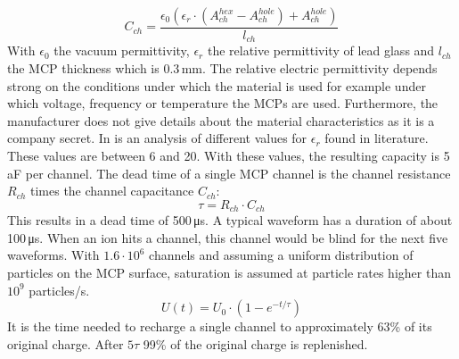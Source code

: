 	\begin{equation}
		C_{ch} = \frac{\epsilon_0  (\epsilon_r \cdot (A^{hex}_{ch} - A^{hole}_{ch})+ A^{hole}_{ch})}{l_{ch}}
	\end{equation}
	With $\epsilon_0$ the vacuum permittivity, $\epsilon_r$ the relative permittivity of lead glass and $l_{ch}$ the MCP thickness which is 0.3\,\si{\milli\meter}. The relative electric permittivity depends strong on the conditions under which the material is used for example under which voltage, frequency or temperature the MCPs are used. Furthermore, the manufacturer does not give details about the material characteristics as it is a company secret. In \cite{Diss_Neuland} is an analysis of different values for $\epsilon_r$ found in literature. These values are between 6 and 20. With these values, the resulting capacity is 5\,\si{\atto\farad} per channel. The dead time of a single MCP channel is the channel resistance $R_{ch}$ times the channel capacitance $C_{ch}$:
	\begin{equation}
		\tau = R_{ch}\cdot C_{ch}
	\end{equation}
	This results in a dead time of 500\,\si{\micro\second}. A typical waveform has a duration of about 100\,\si{\micro\second}. When an ion hits a channel, this channel would be blind for the next five waveforms. With $1.6\cdot10^6$ channels and assuming a uniform distribution of particles on the MCP surface, saturation is assumed at particle rates higher than $10^9$ particles/\si{\second}. %
	\begin{equation}
		U(t) = U_0\cdot(1- e^{-t/\tau})
	\end{equation}
	It is the time needed to recharge a single channel to approximately 63\% of its original charge. After $5\tau$ 99\% of the original charge is replenished. %
	
	
	
	
